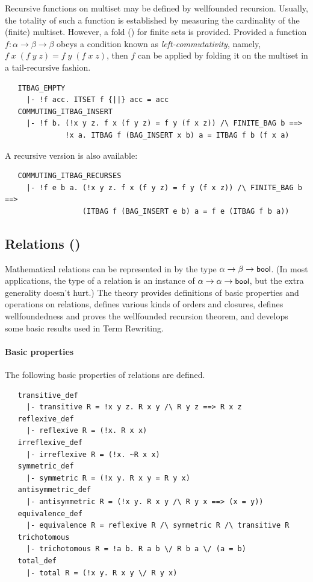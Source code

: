 {Recursive functions on multiset may be defined by wellfounded
recursion. Usually, the totality of such a function is established by
measuring the cardinality of the (finite) multiset. However, a fold
() for finite sets is provided.  Provided a function
$f:\alpha\to\beta\to\beta$ obeys a condition known as
\emph{left-commutativity}, namely, $f\;x\;(f\;y\;z) =
f\;y\;(f\;x\;z)$, then $f$ can be applied by folding it on the
multiset in a tail-recursive fashion.
%
\begin{hol}
\begin{verbatim}
   ITBAG_EMPTY
     |- !f acc. ITSET f {||} acc = acc
   COMMUTING_ITBAG_INSERT
     |- !f b. (!x y z. f x (f y z) = f y (f x z)) /\ FINITE_BAG b ==>
              !x a. ITBAG f (BAG_INSERT x b) a = ITBAG f b (f x a)
\end{verbatim}
\end{hol}
%
A recursive version is also available:
\begin{hol}
\begin{verbatim}
   COMMUTING_ITBAG_RECURSES
     |- !f e b a. (!x y z. f x (f y z) = f y (f x z)) /\ FINITE_BAG b ==>
                  (ITBAG f (BAG_INSERT e b) a = f e (ITBAG f b a))
\end{verbatim}
\end{hol}

\subsection{Relations ()}\label{relation}

Mathematical relations can be represented in \HOL{} by the type
$\alpha \to\beta\to\mbox{\small{\textbf{\sf{bool}}}}$. (In most applications, the type of a
relation is an instance of $\alpha \to\alpha\to\mbox{\small{\textbf{\sf{bool}}}}$, but the
extra generality doesn't hurt.) The theory 
provides definitions of basic properties and operations on relations,
defines various kinds of orders and closures, defines wellfoundedness
and proves the wellfounded recursion theorem, and develops some
basic results used in Term Rewriting.

\paragraph {Basic properties}

The following basic properties of relations are defined.
%
\begin{hol}
\begin{verbatim}
   transitive_def
     |- transitive R = !x y z. R x y /\ R y z ==> R x z
   reflexive_def
     |- reflexive R = (!x. R x x)
   irreflexive_def
     |- irreflexive R = (!x. ~R x x)
   symmetric_def
     |- symmetric R = (!x y. R x y = R y x)
   antisymmetric_def
     |- antisymmetric R = (!x y. R x y /\ R y x ==> (x = y))
   equivalence_def
     |- equivalence R = reflexive R /\ symmetric R /\ transitive R
   trichotomous
     |- trichotomous R = !a b. R a b \/ R b a \/ (a = b)
   total_def
     |- total R = (!x y. R x y \/ R y x)
\end{verbatim}
\end{hol}

}
